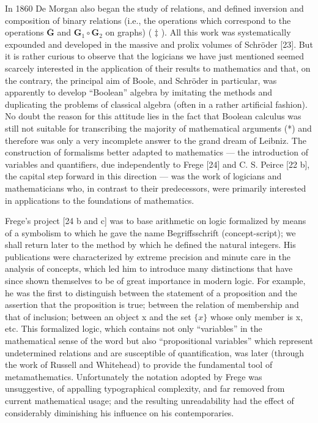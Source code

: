 In 1860 De Morgan also began the study of relations, and defined inversion and composition of binary relations (i.e., the operations which correspond to the operations \(\overline{\mathbf{G}}\) and \(\mathbf{G}_1 \circ \mathbf{G}_2\) on graphs) ( \(\ddagger\) ). All this work was systematically expounded and developed in the massive and prolix volumes of Schröder {[}23{]}. But it is rather curious to observe that the logicians we have just mentioned seemed scarcely interested in the application of their results to mathematics and that, on the contrary, the principal aim of Boole, and Schröder in particular, was apparently to develop ``Boolean'' algebra by imitating the methods and duplicating the problems of classical algebra (often in a rather artificial fashion). No doubt the reason for this attitude lies in the fact that Boolean calculus was still not suitable for transcribing the majority of mathematical arguments (*) and therefore was only a very incomplete answer to the grand dream of Leibniz. The construction of formalisms better adapted to mathematics --- the introduction of variables and quantifiers, due independently to Frege {[}24{]} and C. S. Peirce {[}22 b{]}, the capital step forward in this direction --- was the work of logicians and mathematicians who, in contrast to their predecessors, were primarily interested in applications to the foundations of mathematics.

Frege's project {[}24 b and c{]} was to base arithmetic on logic formalized by means of a symbolism to which he gave the name Begriffsschrift (concept-script); we shall return later to the method by which he defined the natural integers. His publications were characterized by extreme precision and minute care in the analysis of concepts, which led him to introduce many distinctions that have since shown themselves to be of great importance in modern logic. For example, he was the first to distinguish between the statement of a proposition and the assertion that the proposition is true; between the relation of membership and that of inclusion; between an object x and the set \(\{x\}\) whose only member is x, etc. This formalized logic, which contains not only ``variables'' in the mathematical sense of the word but also ``propositional variables'' which represent undetermined relations and are susceptible of quantification, was later (through the work of Russell and Whitehead) to provide the fundamental tool of metamathematics. Unfortunately the notation adopted by Frege was unsuggestive, of appalling typographical complexity, and far removed from current mathematical usage; and the resulting unreadability had the effect of considerably diminishing his influence on his contemporaries.

